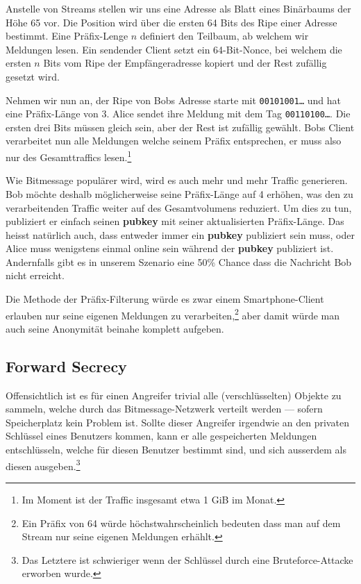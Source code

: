 \documentclass{bfh}
\newcommand{\obj}[1]{\textbf{\textcolor{OliveGreen}{#1}}}
\begin{document}
  Anstelle von Streams stellen wir uns eine Adresse als Blatt eines Binärbaums der Höhe 65 vor. Die Position wird über die ersten 64 Bits des Ripe einer Adresse bestimmt. Eine Präfix-Lenge $n$ definiert den Teilbaum, ab welchem wir Meldungen lesen. Ein sendender Client setzt ein 64-Bit-Nonce, bei welchem die ersten $n$ Bits vom Ripe der Empfängeradresse kopiert und der Rest zufällig gesetzt wird.

  Nehmen wir nun an, der Ripe von Bobs Adresse starte mit \texttt{00101001\ldots} und hat eine Präfix-Länge von 3. Alice sendet ihre Meldung mit dem Tag \texttt{00110100\ldots}. Die ersten drei Bits müssen gleich sein, aber der Rest ist zufällig gewählt. Bobs Client verarbeitet nun alle Meldungen welche seinem Präfix entsprechen, er muss also nur  des Gesamttraffics lesen.\footnote{Im Moment ist der Traffic insgesamt etwa 1 GiB im Monat.}

  Wie Bitmessage populärer wird, wird es auch mehr und mehr Traffic generieren. Bob möchte deshalb möglicherweise seine Präfix-Länge auf 4 erhöhen, was den zu verarbeitenden Traffic weiter auf  des Gesamtvolumens reduziert. Um dies zu tun, publiziert er einfach seinen \obj{pubkey} mit seiner aktualisierten Präfix-Länge. Das heisst natürlich auch, dass entweder immer ein \obj{pubkey} publiziert sein muss, oder Alice muss wenigstens einmal online sein während der \obj{pubkey} publiziert ist. Andernfalls gibt es in unserem Szenario eine 50\% Chance dass die Nachricht Bob nicht erreicht.

  Die Methode der Präfix-Filterung würde es zwar einem Smartphone-Client erlauben nur seine eigenen Meldungen zu verarbeiten,\footnote{Ein Präfix von 64 würde höchstwahrscheinlich bedeuten dass man auf dem Stream nur seine eigenen Meldungen erhählt.} aber damit würde man auch seine Anonymität beinahe komplett aufgeben.

  \subsection{Forward Secrecy}

  Offensichtlich ist es für einen Angreifer trivial alle (verschlüsselten) Objekte zu sammeln, welche durch das Bitmessage-Netzwerk verteilt werden --- sofern Speicherplatz kein Problem ist. Sollte dieser Angreifer irgendwie an den privaten Schlüssel eines Benutzers kommen, kann er alle gespeicherten Meldungen entschlüsseln, welche für diesen Benutzer bestimmt sind, und sich ausserdem als diesen ausgeben.\footnote{Das Letztere ist schwieriger wenn der Schlüssel durch eine Bruteforce-Attacke erworben wurde.}
\end{document}
